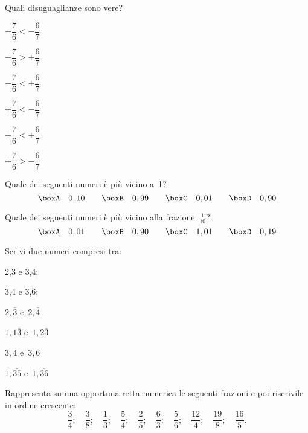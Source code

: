 \begin{esercizio}
\label{ese:3.39}
Quali disuguaglianze sono vere?
\begin{multicols}{2}
\TabPositions{2.5cm}
\begin{enumeratea}
\spazielenx
 \item $-\dfrac{7}{6}<-\dfrac{6}{7}$\tab\boxV\qquad\boxF
 \item $-\dfrac{7}{6}>+\dfrac{6}{7}$\tab\boxV\qquad\boxF
 \item $-\dfrac{7}{6}<+\dfrac{6}{7}$\tab\boxV\qquad\boxF
 \item $+\dfrac{7}{6}<-\dfrac{6}{7}$\tab\boxV\qquad\boxF
 \item $+\dfrac{7}{6}<+\dfrac{6}{7}$\tab\boxV\qquad\boxF
 \item $+\dfrac{7}{6}>-\dfrac{6}{7}$\tab\boxV\qquad\boxF
 \end{enumeratea}
\end{multicols}
\end{esercizio}

\begin{esercizio}
\label{ese:3.40}
Quale dei seguenti numeri è più vicino a~1?
\[\boxA\quad0,10\qquad\boxB\quad0,99\qquad\boxC\quad0,01\qquad\boxD\quad0,90\]
\end{esercizio}

 \begin{esercizio}
\label{ese:3.41}
Quale dei seguenti numeri è più vicino alla frazione~$\frac{1}{10}$?
\[\boxA\quad0,01\qquad\boxB\quad0,90\qquad\boxC\quad1,01\qquad\boxD\quad0,19\]
 \end{esercizio}

\begin{esercizio}
\label{ese:3.42}
Scrivi due numeri compresi tra:
\begin{multicols}{3}
\begin{enumeratea}
 \item 2,3 e 3,4;
 \item 3,4 e 3,6;
 \item $2,\overline{3}$ e~$2,\overline{4}$
 \item $1,1\overline{3}$ e~$1,2\overline{3}$
 \item $3,\overline{4}$ e~$3,\overline{6}$
 \item $1,\overline{35}$ e~$1,\overline{36}$
\end{enumeratea}
\end{multicols}
\end{esercizio}

\begin{esercizio}
 \label{ese:3.43}
Rappresenta su una opportuna retta numerica le seguenti frazioni e poi 
riscrivile in ordine crescente:
\[\frac{3}{4}; \quad \frac{3}{8}; \quad \frac{1}{3}; \quad \frac{5}{4}; 
\quad \frac{2}{5}; \quad \frac{6}{3}; \quad \frac{5}{6}; 
\quad \frac{12}{4}; \quad \frac{19}{8}; \quad \frac{16}{5}.\]
\end{esercizio}

